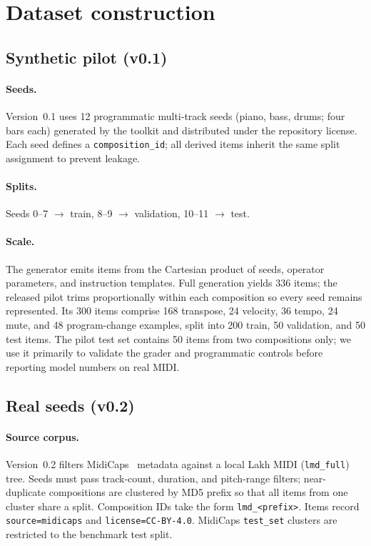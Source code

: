 \section{Dataset construction}

\subsection{Synthetic pilot (v0.1)}

\paragraph{Seeds.}
Version~0.1 uses 12 programmatic multi-track seeds (piano, bass, drums; four bars each) generated by the toolkit and distributed under the repository license. Each seed defines a \texttt{composition\_id}; all derived items inherit the same split assignment to prevent leakage.

\paragraph{Splits.}
Seeds 0--7 $\to$ train, 8--9 $\to$ validation, 10--11 $\to$ test.

\paragraph{Scale.}
The generator emits items from the Cartesian product of seeds, operator parameters, and instruction templates. Full generation yields 336 items; the released pilot trims proportionally within each composition so every seed remains represented. Its 300 items comprise 168 transpose, 24 velocity, 36 tempo, 24 mute, and 48 program-change examples, split into 200 train, 50 validation, and 50 test items. The pilot test set contains 50 items from two compositions only; we use it primarily to validate the grader and programmatic controls before reporting model numbers on real MIDI.

\subsection{Real seeds (v0.2)}

\paragraph{Source corpus.}
Version~0.2 filters MidiCaps~\cite{midicaps2024} metadata against a local Lakh MIDI (\texttt{lmd\_full}) tree. Seeds must pass track-count, duration, and pitch-range filters; near-duplicate compositions are clustered by MD5 prefix so that all items from one cluster share a split. Composition IDs take the form \texttt{lmd\_<prefix>}. Items record \texttt{source=midicaps} and \texttt{license=CC-BY-4.0}. MidiCaps \texttt{test\_set} clusters are restricted to the benchmark test split.

